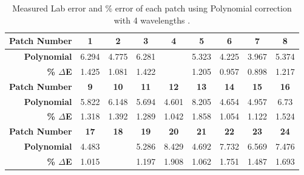 \begin{table}[H]
  \caption{Measured Lab error and \% error of each patch using Polynomial correction with 4 wavelengths .}\n  \begin{center}
    \begin{tabularx}{\textwidth}{r c c c c c c c c}
    \toprule
        \textbf{Patch Number} & \textbf{1} & \textbf{2} & \textbf{3} & \textbf{4} & \textbf{5} & \textbf{6} & \textbf{7} & \textbf{8}\\ \midrule 
        \textbf{Polynomial} &6.294 &4.775 &6.281 &\cellcolor{colorred}{8.522} &5.323 &4.225 &3.967 &5.374\\ 
        \textbf{\textbf{\% $\Delta$E}} &1.425 &1.081 &1.422 &\cellcolor{colorred}{1.929} &1.205 &0.957 &0.898 &1.217\\ \midrule 
        \textbf{Patch Number} & \textbf{9} & \textbf{10} & \textbf{11} & \textbf{12} & \textbf{13} & \textbf{14} & \textbf{15} & \textbf{16}\\ \midrule 
        \textbf{Polynomial} &5.822 &6.148 &5.694 &4.601 &8.205 &4.654 &4.957 &6.73\\ 
        \textbf{\textbf{\% $\Delta$E}} &1.318 &1.392 &1.289 &1.042 &1.858 &1.054 &1.122 &1.524\\ \midrule 
        \textbf{Patch Number} & \textbf{17} & \textbf{18} & \textbf{19} & \textbf{20} & \textbf{21} & \textbf{22} & \textbf{23} & \textbf{24}\\ \midrule 
        \textbf{Polynomial} &4.483 &\cellcolor{colorgreen}{3.894} &5.286 &8.429 &4.692 &7.732 &6.569 &7.476\\ 
        \textbf{\textbf{\% $\Delta$E}} &1.015 &\cellcolor{colorgreen}{0.882} &1.197 &1.908 &1.062 &1.751 &1.487 &1.693\\ \midrule 
    \bottomrule
    \end{tabularx}
  \end{center}
\end{table}
